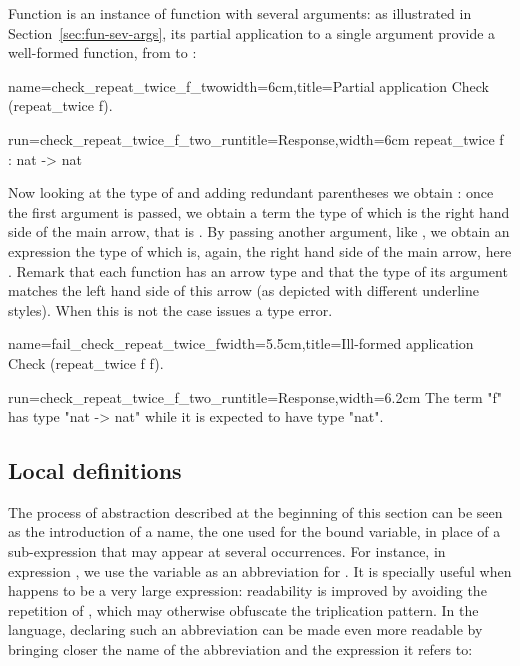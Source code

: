 Function   is an instance of function with several
arguments: as illustrated in Section~\ref{sec:fun-sev-args}, its
partial application to a single argument provide a well-formed
function, from  to :

\begin{coq}{name=check_repeat_twice_f_two}{width=6cm,title=Partial application}
Check (repeat_twice f).
\end{coq}
\begin{coqout}{run=check_repeat_twice_f_two_run}{title=Response,width=6cm}
repeat_twice f : nat -> nat
\end{coqout}

Now looking at the type of  and adding redundant parentheses
we obtain :
once the first argument
 is passed, we obtain a term the type of which is
the right hand side of the main arrow, that is .
By passing another argument, like , we obtain an expression
the type of which is, again, the right hand side of the main arrow,
here .
Remark that each function has an arrow type and that the type of its
argument matches the left hand side of this arrow (as depicted with
different underline styles). When this is not the case \Coq{} issues a
type error.

\begin{coq}{name=fail_check_repeat_twice_f}{width=5.5cm,title=Ill-formed
  application}
Check (repeat_twice f f).
\end{coq}
\begin{coqout}{run=check_repeat_twice_f_two_run}{title=Response,width=6.2cm}
The term "f" has type "nat -> nat"
while it is expected to have type "nat".
\end{coqout}

\subsection{Local definitions}

The process of abstraction described at the beginning of this section
can be seen as the introduction of a name, the one used for the bound
variable, in place of a sub-expression that may appear at
several occurrences. For instance, in expression
, we use the variable  as an
abbreviation for . It is specially useful when  happens to
be a very large expression: readability is improved by avoiding the
repetition of , which may otherwise obfuscate the triplication
pattern. In the \Coq{}
language, declaring such an abbreviation can be made even more
readable by bringing closer the name of the abbreviation  and the
expression it refers to:

